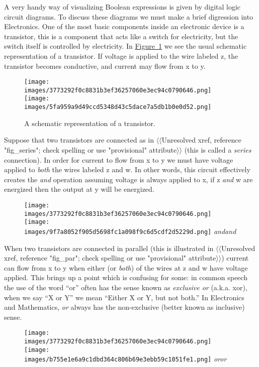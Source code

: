 \documentclass[10pt,]{book}
\theoremstyle{plain}
\theoremstyle{definition}
\theoremstyle{definition}
\numberwithin{equation}{section}
\begin{document}
    A very handy way of visualizing Boolean expressions is given by
    digital logic circuit diagrams. To discuss these diagrams we
    must make a brief digression into Electronics. One of the most
    basic components inside an electronic device is a 
    transistor,
    this is a component that acts like a switch for electricity,
    but the switch itself is controlled by electricity. In \hyperref[fig_trans]{Figure~\ref{fig_trans}}
    we see the usual schematic representation of a transistor. If voltage
    is applied to the wire labeled z, the transistor becomes conductive,
    and current may flow from x to y.
\leavevmode%
\begin{figure}
\centering
\texttt{[image: images/3773292f0c8831b3ef36257060e3ec94c0790646.png]}
\texttt{[image: images/5fa959a9d49ccd5348d43c5dace7a5db1b0e0d52.png]}
\caption{A schematic representation of a transistor.\label{fig_trans}}
\end{figure}
\par

    Suppose that two transistors are connected as in {$\langle\langle$Unresolved xref, reference "fig\_series"; check spelling or use "provisional" attribute$\rangle\rangle$}
    (this is called a \emph{series} connection).
    In order for current to flow
    from x to y we must have voltage applied to \emph{both} the wires labeled
    z and w. In other words, this circuit effectively creates the \emph{and}
    operation \textemdash{} assuming voltage is always applied to x, if z \emph{and} w
    are energized then the output at y will be energized.
\leavevmode%
\begin{figure}
\centering
\texttt{[image: images/3773292f0c8831b3ef36257060e3ec94c0790646.png]}
\texttt{[image: images/9f7a8052f905d5698fc1a098f9c6d5cdf2d5229d.png]}
\emph{and}\emph{and}\end{figure}
\par

    When two transistors are connected in parallel (this is illustrated in
    {$\langle\langle$Unresolved xref, reference "fig\_par"; check spelling or use "provisional" attribute$\rangle\rangle$}) current can flow from x to y when either (or \emph{both})
    of the wires at z and w have voltage applied. This brings up a point
    which is confusing for some: in common speech the use of the word ``or'' often
    has the sense known as \emph{exclusive or} (a.k.a. xor), when we say ``X or Y''
    we mean ``Either X or Y, but not both.'' In Electronics and Mathematics,
    \emph{or} always has the non-exclusive (better known as
    inclusive) sense.
\leavevmode%
\begin{figure}
\centering
\texttt{[image: images/3773292f0c8831b3ef36257060e3ec94c0790646.png]}
\texttt{[image: images/b755e1e6a9c1dbd364c806b69e3ebb59c1051fe1.png]}
\emph{or}\emph{or}\end{figure}
\par
\end{document}

